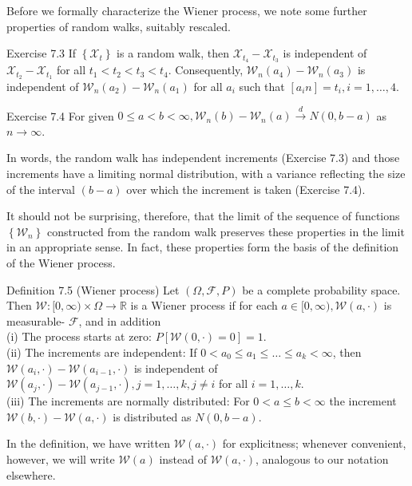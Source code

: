 \documentclass[10pt]{article}
\begin{document}
Before we formally characterize the Wiener process, we note some further properties of random walks, suitably rescaled.

Exercise 7.3 If $\left\{\mathcal{X}_{t}\right\}$ is a random walk, then $\mathcal{X}_{t_{4}}-\mathcal{X}_{t_{3}}$ is independent of $\mathcal{X}_{t_{2}}-\mathcal{X}_{t_{1}}$ for all $t_{1}<t_{2}<t_{3}<t_{4}$. Consequently, $\mathcal{W}_{n}\left(a_{4}\right)-\mathcal{W}_{n}\left(a_{3}\right)$ is independent of $\mathcal{W}_{n}\left(a_{2}\right)-\mathcal{W}_{n}\left(a_{1}\right)$ for all $a_{i}$ such that $\left[a_{i} n\right]=t_{i}, i=1, \ldots, 4$.

Exercise 7.4 For given $0 \leq a<b<\infty, \mathcal{W}_{n}(b)-\mathcal{W}_{n}(a) \xrightarrow{d} N(0, b-a)$ as $n \rightarrow \infty$.

In words, the random walk has independent increments (Exercise 7.3) and those increments have a limiting normal distribution, with a variance reflecting the size of the interval $(b-a)$ over which the increment is taken (Exercise 7.4).

It should not be surprising, therefore, that the limit of the sequence of functions $\left\{\mathcal{W}_{n}\right\}$ constructed from the random walk preserves these properties in the limit in an appropriate sense. In fact, these properties form the basis of the definition of the Wiener process.

Definition 7.5 (Wiener process) Let $(\Omega, \mathcal{F}, P)$ be a complete probability space. Then $\mathcal{W}:[0, \infty) \times \Omega \rightarrow \mathbb{R}$ is a Wiener process if for each $a \in[0, \infty), \mathcal{W}(a, \cdot)$ is measurable- $\mathcal{F}$, and in addition\\
(i) The process starts at zero: $P[\mathcal{W}(0, \cdot)=0]=1$.\\
(ii) The increments are independent: If $0<a_{0} \leq a_{1} \leq \ldots \leq a_{k}<\infty$, then $\mathcal{W}\left(a_{i}, \cdot\right)-\mathcal{W}\left(a_{i-1}, \cdot\right)$ is independent of $\mathcal{W}\left(a_{j}, \cdot\right)-\mathcal{W}\left(a_{j-1}, \cdot\right), j= 1, \ldots, k, j \neq i$ for all $i=1, \ldots, k$.\\
(iii) The increments are normally distributed: For $0<a \leq b<\infty$ the increment $\mathcal{W}(b, \cdot)-\mathcal{W}(a, \cdot)$ is distributed as $N(0, b-a)$.

In the definition, we have written $\mathcal{W}(a, \cdot)$ for explicitness; whenever convenient, however, we will write $\mathcal{W}(a)$ instead of $\mathcal{W}(a, \cdot)$, analogous to our notation elsewhere.
\end{document}
